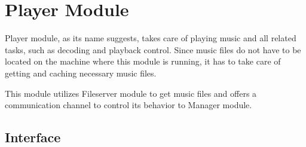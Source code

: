 \section {Player Module}

Player module, as its name suggests, takes care of playing music and all related tasks, such as decoding and playback control. Since music files do not have to be located on the machine where this module is running, it has to take care of getting and caching necessary music files.
\par
This module utilizes Fileserver module to get music files and offers a communication channel to control its behavior to Manager module.

\subsection{Interface}

